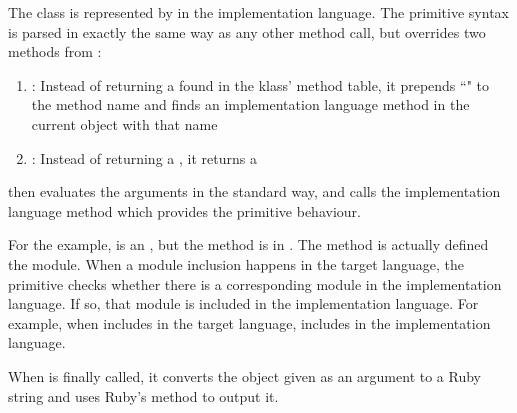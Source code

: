 The  class is represented by  in the implementation language. The primitive syntax is parsed in exactly the same way as any other method call, but \- overrides two methods from :

\begin{enumerate}
  \item \textbf{}: Instead of returning a  found in the klass' method table, it prepends ``" to the method name and finds an implementation language method in the current  object with that name
  
  \item \textbf{}: Instead of returning a , it returns a 
\end{enumerate}

 then evaluates the arguments in the standard way, and calls the implementation language method which provides the primitive behaviour.

For the example,  is an , but the method is in . The  method is actually defined the  module. When a module inclusion happens in the target language, the primitive checks whether there is a corresponding module in the implementation language. If so, that module is included in the implementation language. For example, when  includes  in the target language,  includes  in the implementation language.

When  is finally called, it converts the object given as an argument to a Ruby string and uses Ruby's  method to output it.
